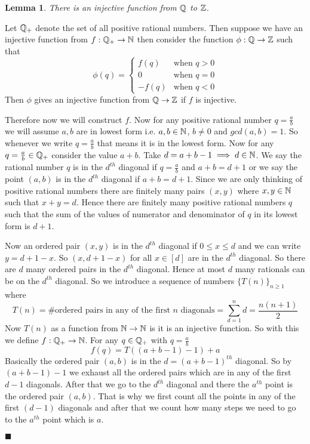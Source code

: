 \documentclass[a4paper, 11pt]{article}
\newtheorem{lemma}{Lemma}
\renewenvironment{proof}{\noindent{\it \textbf{Proof:}}\hspace*{1em}}{\hfill $\blacksquare$\bigskip\\}
\begin{document}
{\begin{itemize}
\begin{lemma}\label{qtozinj}
	There is an injective function from $\mathbb{Q}$ to $\mathbb{Z}$. 
\end{lemma}
\begin{proof}
	Let $\mathbb{Q}_+$ denote the set of all positive rational numbers. Then suppose we have an injective function from $f:\mathbb{Q}_+\to\mathbb{N}$ then consider the function $\phi:\mathbb{Q}\to \mathbb{Z}$ such that $$\phi(q)=\begin{cases}
		f(q) & \text{when $q>0$}\\
		0 & \text{when $q=0$}\\
		-f(q) & \text{when $q<0$}
	\end{cases}$$Then $\phi$ gives an injective function from $\mathbb{Q}\to \mathbb{Z}$ if $f$ is injective. 

Therefore now we will construct $f$. Now for any positive rational number $q=\frac{a}{b}$ we will assume $a,b$ are in lowest form i.e. $a,b\in\mathbb{N}$, $b\neq 0$ and $gcd(a,b)=1$. So whenever we write $q=\frac{a}{b}$ that means it is in the lowest form. Now for any $q=\frac{a}{b}\in\mathbb{Q}_+$ consider the value $a+b$. Take $d=a+b-1\implies d\in\mathbb{N}$. We say the rational number $q$ is in the $d^{th}$ diagonal if $q=\frac{a}{b}$ and $a+b=d+1$ or we say the point $(a,b)$ is in the $d^{th}$ diagonal if $a+b=d+1$. Since we are only thinking of positive rational numbers there are finitely many pairs $(x,y)$ where $x,y\in\mathbb{N}$ such that $x+y=d$. Hence there are finitely many positive rational numbers $q$ such that the sum of the values of numerator and denominator of $q$ in its lowest form is $d+1$. 

Now an ordered pair $(x,y)$ is in the $d^{th}$ diagonal if $0\leq x\leq d$ and we can write $y=d+1-x$. So $(x,d+1-x)$ for all $x\in[d]$ are in the $d^{th}$ diagonal. So there are $d$ many ordered pairs in the $d^{th}$ diagonal. Hence at most $d$ many rationals can be on the $d^{th}$ diagonal. So we introduce a sequence of numbers $\{T(n)\}_{n\geq 1}$ where $$T(n)=\#\text{ordered pairs in any of the first $n$ diagonals}=\sum_{d=1}^nd=\frac{n(n+1)}2$$Now $T(n)$ as a function from $\mathbb{N}\to \mathbb{N}$ is it is an injective function. So with this we define $f:\mathbb{Q}_+\to\mathbb{N}$. For any $q\in\mathbb{Q}_+$ with $q=\frac{a}{b}$ $$f(q)=T((a+b-1)-1)+a$$Basically the ordered pair $(a,b)$ is in the $d=(a+b-1)^{th}$ diagonal. So by $(a+b-1)-1$ we exhaust all the ordered pairs which are in any of the first $d-1$ diagonals. After that we go to the $d^{th}$ diagonal and there the $a^{th}$ point is the ordered pair $(a,b)$. That is why we first count all the points in any of the first $(d-1)$ diagonals and after that we count how many steps we need to go to the $a^{th}$ point which is $a$.


\end{proof}
\end{itemize}}
\end{document}
